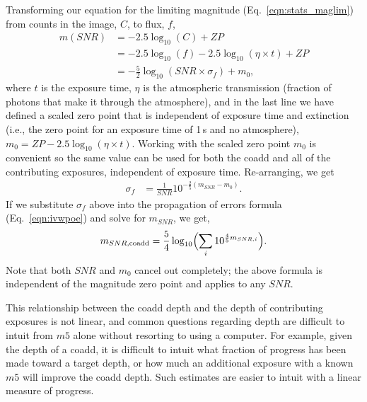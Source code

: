 \documentclass[DM,authoryear,toc]{lsstdoc}
\begin{document}
Transforming our equation for the limiting magnitude (Eq.~\ref{eqn:stats_maglim}) from counts in the image, $C$, to flux, $f$,
\begin{align}
m(SNR) &= -2.5 \log_{10}(C) + ZP \\
       &= -2.5 \log_{10}(f) - 2.5\log_{10}(\eta \times t) + ZP \\
       &= -\frac{5}{2} \log_{10}({SNR} \times \sigma_f) + m_0,
\end{align}
where $t$ is the exposure time, $\eta$ is the atmospheric transmission (fraction of photons that make it through the atmosphere), and in the last line we have defined a scaled zero point that is independent of exposure time and extinction (i.e., the zero point for an exposure time of 1\,s and no atmosphere), $m_0 = ZP - 2.5\log_{10}(\eta \times t)$.
Working with the scaled zero point $m_0$ is convenient so the same value can be used for both the coadd and all of the contributing exposures, independent of exposure time. 
Re-arranging, we get
\begin{align}
\sigma_f &= \frac{1}{{SNR}} 10^{-\frac{2}{5} (m_{SNR} - m_0)}.
\end{align}
If we substitute $\sigma_f$ above into the propagation of errors formula (Eq.~\ref{eqn:ivwpoe}) and solve for $m_{SNR}$, we get,
\begin{equation}
m_{SNR,{\rm coadd}} = \frac{5}{4} \log_{10}\Bigl( \sum_i 10^{\frac{4}{5}m_{{SNR}, i}} \Bigr).
\end{equation}
Note that both $SNR$ and $m_0$ cancel out completely; the above formula is independent of the magnitude zero point and applies to any $SNR$.

This relationship between the coadd depth and the depth of contributing exposures is not linear, and common questions regarding depth are difficult to intuit from $m5$ alone without resorting to using a computer. For example, given the depth of a coadd, it is difficult to intuit what fraction of progress has been made toward a target depth, or how much an additional exposure with a known $m5$ will improve the coadd depth. Such estimates are easier to intuit with a linear measure of progress.
\end{document}
